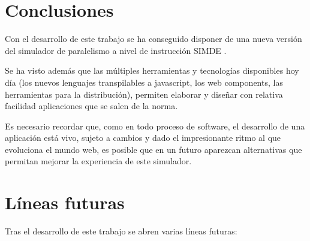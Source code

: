 \section{Conclusiones}
\label{7:sec1}

Con el desarrollo de este trabajo se ha conseguido disponer de una nueva versión
del simulador de paralelismo a nivel de instrucción SIMDE \cite{NuevaURLSimde}. 

Se ha visto además que las múltiples herramientas y tecnologías disponibles hoy
día (los nuevos lenguajes transpilables a javascript, los web components, las 
herramientas para la distribución), permiten elaborar y diseñar con relativa
facilidad aplicaciones que se salen de la norma.

Es necesario recordar que, como en todo proceso de software, el desarrollo de una 
aplicación está vivo, sujeto a cambios y dado el impresionante ritmo al que evoluciona
el mundo web, es posible que en un futuro aparezcan alternativas que permitan mejorar 
la experiencia de este simulador.

\section{Líneas futuras}
\label{7:sec2}

Tras el desarrollo de este trabajo se abren varias líneas futuras: 

